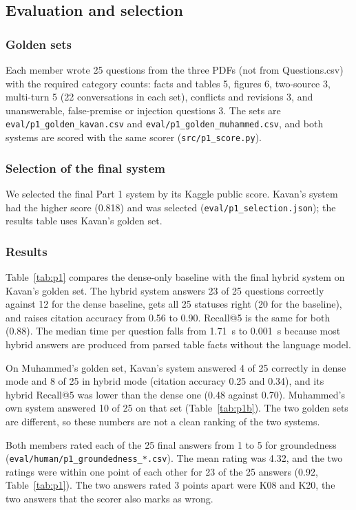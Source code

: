 \subsection{Evaluation and selection}
\subsubsection{Golden sets}
Each member wrote 25 questions from the three PDFs (not from Questions.csv) with the required category counts: facts and tables 5, figures 6, two-source 3, multi-turn 5 (22 conversations in each set), conflicts and revisions 3, and unanswerable, false-premise or injection questions 3. The sets are \texttt{eval/p1\_golden\_kavan.csv} and \texttt{eval/p1\_golden\_muhammed.csv}, and both systems are scored with the same scorer (\texttt{src/p1\_score.py}).

\subsubsection{Selection of the final system}\label{sec:p1sel}
We selected the final Part 1 system by its Kaggle public score. Kavan's system had the higher score (0.818) and was selected (\texttt{eval/p1\_selection.json}); the results table uses Kavan's golden set.

\subsubsection{Results}
Table~\ref{tab:p1} compares the dense-only baseline with the final hybrid system on Kavan's golden set. The hybrid system answers 23 of 25 questions correctly against 12 for the dense baseline, gets all 25 statuses right (20 for the baseline), and raises citation accuracy from 0.56 to 0.90. Recall@5 is the same for both (0.88). The median time per question falls from 1.71~s to 0.001~s because most hybrid answers are produced from parsed table facts without the language model.

On Muhammed's golden set, Kavan's system answered 4 of 25 correctly in dense mode and 8 of 25 in hybrid mode (citation accuracy 0.25 and 0.34), and its hybrid Recall@5 was lower than the dense one (0.48 against 0.70). Muhammed's own system answered 10 of 25 on that set (Table~\ref{tab:p1b}). The two golden sets are different, so these numbers are not a clean ranking of the two systems.

Both members rated each of the 25 final answers from 1 to 5 for groundedness (\texttt{eval/human/p1\_groundedness\_*.csv}). The mean rating was 4.32, and the two ratings were within one point of each other for 23 of the 25 answers (0.92, Table~\ref{tab:p1}). The two answers rated 3 points apart were K08 and K20, the two answers that the scorer also marks as wrong.


